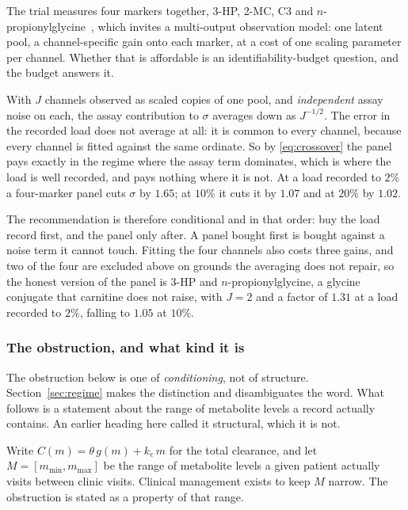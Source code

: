 \begin{remark}
\label{rem:panel}
The trial measures four markers together, 3-HP, 2-MC, C3 and
$n$-propionylglycine~\cite{trial_phase12}, which invites a multi-output observation model:
one latent pool, a channel-specific gain onto each marker, at a cost of one scaling
parameter per channel. Whether that is affordable is an identifiability-budget question, and
the budget answers it.

With $J$ channels observed as scaled copies of one pool, and \emph{independent} assay noise
on each, the assay contribution to $\sigma$ averages down as $J^{-1/2}$. The error in the
recorded load does not average at all: it is common to every channel, because every channel
is fitted against the same ordinate. So by \eqref{eq:crossover} the panel pays exactly in
the regime where the assay term dominates, which is where the load is well recorded, and
pays nothing where it is not. At a load recorded to $2\%$ a four-marker panel cuts $\sigma$
by $1.65$; at $10\%$ it cuts it by $1.07$ and at $20\%$ by $1.02$.

The recommendation is therefore conditional and in that order: buy the load record
first, and the panel only after. A panel bought first is bought against a noise term it
cannot touch. Fitting the four channels also costs three gains, and two of the four are
excluded above on grounds the averaging does not repair, so the honest version of the panel
is 3-HP and $n$-propionylglycine, a glycine conjugate that carnitine does not raise, with
$J = 2$ and a factor of $1.31$ at a load recorded to $2\%$, falling to $1.05$ at $10\%$.
\end{remark}

\subsubsection{The obstruction, and what kind it is}

The obstruction below is one of \emph{conditioning}, not of structure. Section~\ref{sec:regime} makes the distinction and disambiguates
the word. What follows is a statement about the range of metabolite levels a record
actually contains. An earlier heading here called it structural, which it is not.

Write $C(m) = \theta\, g(m) + k_e\, m$ for the total clearance, and let
$M = [m_{\min}, m_{\max}]$ be the range of metabolite levels a given patient actually
visits between clinic visits. Clinical management exists to keep $M$ narrow. The
obstruction is stated as a property of that range.

